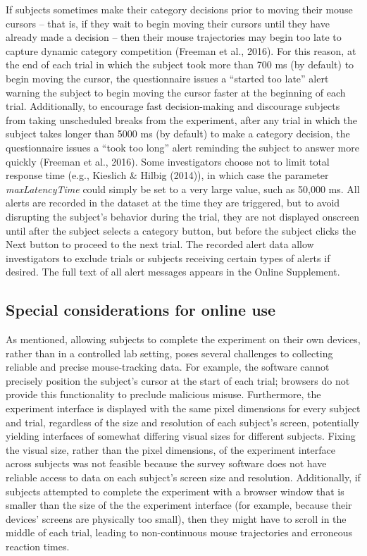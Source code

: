 \documentclass[]{article}
\begin{document}
If subjects sometimes make their category decisions prior to moving
their mouse cursors -- that is, if they wait to begin moving their
cursors until they have already made a decision -- then their mouse
trajectories may begin too late to capture dynamic category competition
(Freeman et al., 2016). For this reason, at the end of each trial in
which the subject took more than 700 ms (by default) to begin moving the
cursor, the questionnaire issues a ``started too late'' alert warning
the subject to begin moving the cursor faster at the beginning of each
trial. Additionally, to encourage fast decision-making and discourage
subjects from taking unscheduled breaks from the experiment, after any
trial in which the subject takes longer than 5000 ms (by default) to
make a category decision, the questionnaire issues a ``took too long''
alert reminding the subject to answer more quickly (Freeman et al.,
2016). Some investigators choose not to limit total response time (e.g.,
Kieslich \& Hilbig (2014)), in which case the parameter
\emph{maxLatencyTime} could simply be set to a very large value, such as
50,000 ms. All alerts are recorded in the dataset at the time they are
triggered, but to avoid disrupting the subject's behavior during the
trial, they are not displayed onscreen until after the subject selects a
category button, but before the subject clicks the Next button to
proceed to the next trial. The recorded alert data allow investigators
to exclude trials or subjects receiving certain types of alerts if
desired. The full text of all alert messages appears in the Online
Supplement.

\subsection{Special considerations for online use}

\label{sec:special}

As mentioned, allowing subjects to complete the experiment on their own
devices, rather than in a controlled lab setting, poses several
challenges to collecting reliable and precise mouse-tracking data. For
example, the software cannot precisely position the subject's cursor at
the start of each trial; browsers do not provide this functionality to
preclude malicious misuse. Furthermore, the experiment interface is
displayed with the same pixel dimensions for every subject and trial,
regardless of the size and resolution of each subject's screen,
potentially yielding interfaces of somewhat differing visual sizes for
different subjects. Fixing the visual size, rather than the pixel
dimensions, of the experiment interface across subjects was not feasible
because the survey software does not have reliable access to data on
each subject's screen size and resolution. Additionally, if subjects
attempted to complete the experiment with a browser window that is
smaller than the size of the the experiment interface (for example,
because their devices' screens are physically too small), then they
might have to scroll in the middle of each trial, leading to
non-continuous mouse trajectories and erroneous reaction times.
\end{document}
